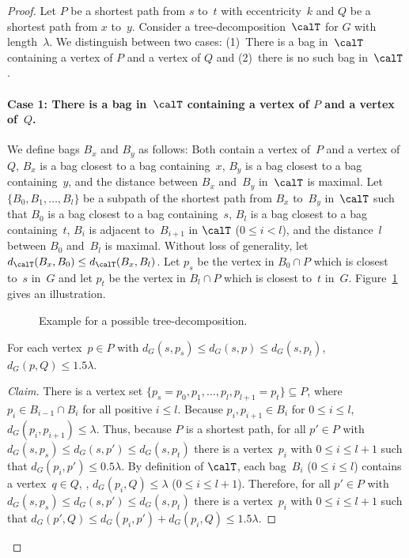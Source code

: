 \begin{proof}
Let $P$ be a shortest path from $s$ to~$t$ with eccentricity~$k$ and $Q$ be a shortest path from $x$ to~$y$.
Consider a tree-decomposition~$\calT$ for $G$ with length~$\lambda$.
We distinguish between two cases:
(1)~There is a bag in~$\calT$ containing a vertex of $P$ and a vertex of $Q$ and (2)~there is no such bag in~$\calT$.

\paragraph{Case 1: There is a bag in~$\calT$ containing a vertex of $P$ and a vertex of~$Q$.}
We define bags $B_x$ and $B_y$ as follows:
Both contain a vertex of~$P$ and a vertex of~$Q$, $B_x$ is a bag closest to a bag containing~$x$, $B_y$ is a bag closest to a bag containing~$y$, and the distance between $B_x$ and~$B_y$ in~$\calT$ is maximal.
Let $\{ B_0, B_1, \ldots, B_l \}$ be a subpath of the shortest path from $B_x$ to~$B_y$ in~$\calT$ such that $B_0$ is a bag closest to a bag containing~$s$, $B_l$ is a bag closest to a bag containing~$t$, $B_i$ is adjacent to~$B_{i+1}$ in $\calT$ ($0 \leq i < l$), and the distance~$l$ between $B_0$ and~$B_l$ is maximal.
Without loss of generality, let $d_{\calT}(B_x, B_0) \leq d_{\calT}(B_x, B_l)$.
Let $p_s$ be the vertex in $B_0 \cap P$ which is closest to~$s$ in~$G$ and let $p_t$ be the vertex in $B_l \cap P$ which is closest to~$t$ in~$G$.
Figure~\ref{fig:TreeDecoEg} gives an illustration.

\begin{figure}
    [htb]
    \centering
    \caption
    {
        Example for a possible tree-decomposition.
    }
    \label{fig:TreeDecoEg}
\end{figure}

\begin{claim}
    \label{cla:PQdis15Lambda}
For each vertex~\( p \in P \) with \( d_G(s, p_s) \leq d_G(s, p) \leq d_G(s, p_t) \), \( d_G(p, Q) \leq 1.5 \lambda \).
\end{claim}

\begin{proof}
    [Claim]
There is a vertex set $\{ p_s = p_0, p_1, \ldots, p_l, p_{l+1} = p_t \} \subseteq P$, where $p_i \in B_{i-1} \cap B_i$ for all positive $i \leq l$.
Because $p_i, p_{i+1} \in B_i$ for $0 \leq i \leq l$, $d_G(p_i, p_{i+1}) \leq \lambda$.
Thus, because $P$ is a shortest path, for all $p' \in P$ with $d_G(s, p_s) \leq d_G(s, p') \leq d_G(s, p_t)$ there is a vertex~$p_i$ with $0 \leq i \leq l+1$ such that $d_G(p_i, p') \leq 0.5 \lambda$.
By definition of $\calT$, each bag~$B_i$ ($0 \leq i \leq l$) contains a vertex~$q \in Q$, \ie, $d_G(p_i, Q) \leq \lambda$ ($0 \leq i \leq l+1$).
Therefore, for all $p' \in P$ with $d_G(s, p_s) \leq d_G(s, p') \leq d_G(s, p_t)$ there is a vertex~$p_i$ with $0 \leq i \leq l+1$ such that $d_G(p', Q) \leq d_G(p_i, p') + d_G(p_i, Q) \leq 1.5 \lambda$.
\end{proof}


\end{proof}

